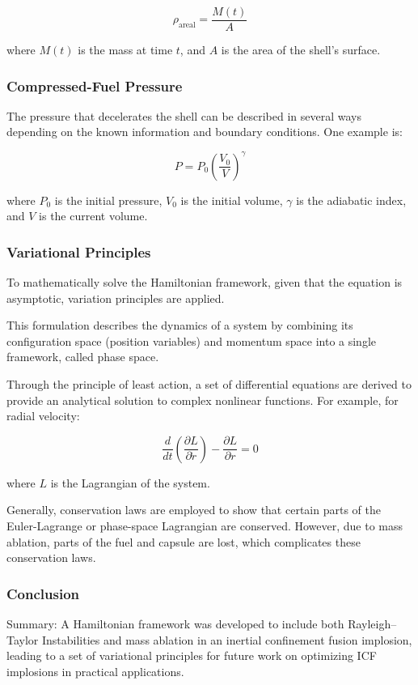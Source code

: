 $$\rho_{\text{areal}} = \frac{M(t)}{A}$$

where $M(t)$ is the mass at time $t$, and $A$ is the area of the shell's surface.

\subsubsection{Compressed-Fuel Pressure}
The pressure that decelerates the shell can be described in several ways depending on the known information and boundary conditions. One example is:

$$P = P_0 \left( \frac{V_0}{V} \right)^\gamma$$

where $P_0$ is the initial pressure, $V_0$ is the initial volume, $\gamma$ is the adiabatic index, and $V$ is the current volume.

\subsubsection{Variational Principles}
To mathematically solve the Hamiltonian framework, given that the equation is asymptotic, variation principles are applied.

This formulation describes the dynamics of a system by combining its configuration space (position variables) and momentum space into a single framework, called phase space.

Through the principle of least action, a set of differential equations are derived to provide an analytical solution to complex nonlinear functions. For example, for radial velocity:

$$\frac{d}{dt} \left( \frac{\partial L}{\partial \dot{r}} \right) - \frac{\partial L}{\partial r} = 0$$

where $L$ is the Lagrangian of the system.

Generally, conservation laws are employed to show that certain parts of the Euler-Lagrange or phase-space Lagrangian are conserved. However, due to mass ablation, parts of the fuel and capsule are lost, which complicates these conservation laws.

\subsubsection{Conclusion}

\par Summary: A Hamiltonian framework was developed to include both Rayleigh--Taylor Instabilities and mass ablation in an inertial confinement fusion implosion, leading to a set of variational principles for future work on optimizing ICF implosions in practical applications.

